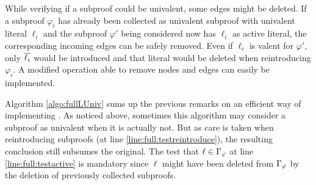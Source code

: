 \documentclass{llncs}
\begin{document}
While verifying if a subproof could be univalent, some edges might be deleted. If a
subproof $\varphi_i$ has already been collected as univalent subproof with univalent literal
$\ell_i$ and the subproof $\varphi'$ being considered now has $\ell_i$ as active literal, the
corresponding incoming edges can be safely removed. Even if $\ell_i$ is valent for $\varphi'$, only
$\overline{\ell_i}$ would be introduced and that literal would be deleted when reintroducing
$\varphi_i$. A modified  operation able to remove nodes and edges can easily be
implemented.

Algorithm \ref{algo:fullLUniv} sums up the previous remarks on an efficient way of implementing
{\LowerUnivalents}. As noticed above, sometimes this algorithm may consider a subproof as univalent when it
is actually not. But as care is taken when reintroducing subproofs (at line \ref{line:full:testreintroduce}),
the resulting conclusion still subsumes the original.  The test that $\ell \in \Gamma_{\varphi}$
at line \ref{line:full:testactive} is mandatory since $\ell$ might have been deleted from
$\Gamma_{\varphi}$ by the deletion of previously collected subproofs.
\end{document}
